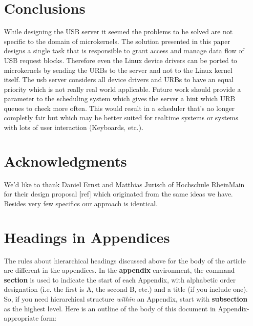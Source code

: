 \documentclass{acm_proc_article-sp}
\begin{document}
\section{Conclusions}
While designing the USB server it seemed the problems to be
solved are not specific to the domain of microkernels.
The solution presented in this paper designs a single task
that is responsible to grant access and manage data flow
of USB request blocks.
Therefore even the Linux device drivers can be ported
to microkernels by sending the URBs to the server and not to
the Linux kernel itself.
The usb server considers all device drivers and URBs to have
an equal priority which is not really real world applicable.
Future work should provide a parameter to the scheduling system
which gives the server a hint which URB queues to check
more often.
This would result in a scheduler that's no longer completly
fair but which may be better suited for realtime systems or
systems with lots of user interaction (Keyboards, etc.).

\section{Acknowledgments}
We'd like to thank Daniel Ernst and Matthias Jurisch
of Hochschule RheinMain for their design proposal [ref]
which originated from the same ideas we have.
Besides very few specifics our approach is identical.

%


%
%
\appendix
\section{Headings in Appendices}
The rules about hierarchical headings discussed above for
the body of the article are different in the appendices.
In the \textbf{appendix} environment, the command
\textbf{section} is used to
indicate the start of each Appendix, with alphabetic order
designation (i.e. the first is A, the second B, etc.) and
a title (if you include one).  So, if you need
hierarchical structure
\textit{within} an Appendix, start with \textbf{subsection} as the
highest level. Here is an outline of the body of this
document in Appendix-appropriate form:
\end{document}
